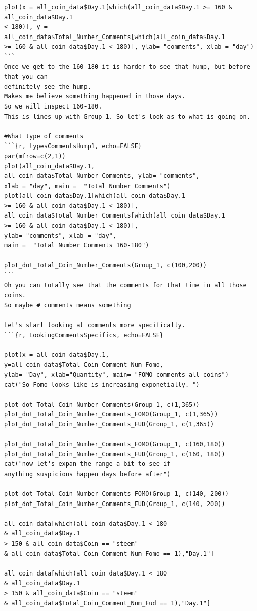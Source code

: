 \documentclass[12pt]{article}
\begin{document}
{\begin{verbatim}
plot(x = all_coin_data$Day.1[which(all_coin_data$Day.1 >= 160 & all_coin_data$Day.1 
< 180)], y = all_coin_data$Total_Number_Comments[which(all_coin_data$Day.1 
>= 160 & all_coin_data$Day.1 < 180)], ylab= "comments", xlab = "day")
```
Once we get to the 160-180 it is harder to see that hump, but before that you can 
definitely see the hump. 
Makes me believe something happened in those days. 
So we will inspect 160-180. 
This is lines up with Group_1. So let's look as to what is going on.

#What type of comments
```{r, typesCommentsHump1, echo=FALSE}
par(mfrow=c(2,1))
plot(all_coin_data$Day.1, 
all_coin_data$Total_Number_Comments, ylab= "comments", 
xlab = "day", main =  "Total Number Comments")
plot(all_coin_data$Day.1[which(all_coin_data$Day.1 
>= 160 & all_coin_data$Day.1 < 180)], all_coin_data$Total_Number_Comments[which(all_coin_data$Day.1 
>= 160 & all_coin_data$Day.1 < 180)], 
ylab= "comments", xlab = "day", 
main =  "Total Number Comments 160-180")

plot_dot_Total_Coin_Number_Comments(Group_1, c(100,200))
```
Oh you can totally see that the comments for that time in all those coins. 
So maybe # comments means something

Let's start looking at comments more specifically.
```{r, LookingCommentsSpecifics, echo=FALSE}

plot(x = all_coin_data$Day.1, 
y=all_coin_data$Total_Coin_Comment_Num_Fomo, 
ylab= "Day", xlab="Quantity", main= "FOMO comments all coins")
cat("So Fomo looks like is increasing exponetially. ")

plot_dot_Total_Coin_Number_Comments(Group_1, c(1,365))
plot_dot_Total_Coin_Number_Comments_FOMO(Group_1, c(1,365))
plot_dot_Total_Coin_Number_Comments_FUD(Group_1, c(1,365))

plot_dot_Total_Coin_Number_Comments_FOMO(Group_1, c(160,180))
plot_dot_Total_Coin_Number_Comments_FUD(Group_1, c(160, 180))
cat("now let's expan the range a bit to see if 
anything suspicious happen days before after")

plot_dot_Total_Coin_Number_Comments_FOMO(Group_1, c(140, 200))
plot_dot_Total_Coin_Number_Comments_FUD(Group_1, c(140, 200))

all_coin_data[which(all_coin_data$Day.1 < 180 
& all_coin_data$Day.1 
> 150 & all_coin_data$Coin == "steem" 
& all_coin_data$Total_Coin_Comment_Num_Fomo == 1),"Day.1"]

all_coin_data[which(all_coin_data$Day.1 < 180 
& all_coin_data$Day.1 
> 150 & all_coin_data$Coin == "steem" 
& all_coin_data$Total_Coin_Comment_Num_Fud == 1),"Day.1"]



\end{verbatim}}
\end{document}
